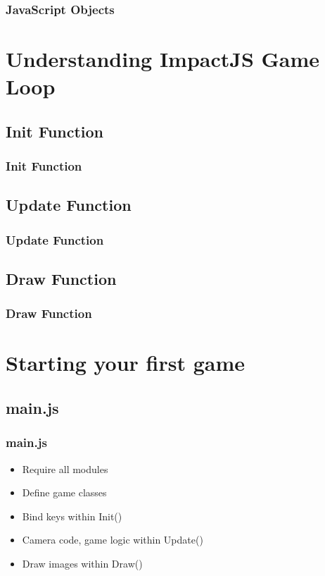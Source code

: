 \documentclass[red]{beamer}
\begin{document}
\begin{frame}
 	\frametitle{JavaScript Objects}
		\lstI
\end{frame}

\section{Understanding ImpactJS Game Loop}

\subsection{Init Function}

\begin{frame}
	\frametitle{Init Function}
		\lstll
\end{frame}

\subsection{Update Function}
\begin{frame}
	\frametitle{Update Function}
		\lstlll
\end{frame}

\subsection{Draw Function}
\begin{frame}
	\frametitle{Draw Function}
		\lstllll
\end{frame}

\section{Starting your first game}
\subsection{main.js}
\begin{frame}
    \frametitle{main.js}
    \begin{itemize}
        \item<1-> Require all modules
        \item<2-> Define game classes
        \item<3-> Bind keys within Init()
        \item<4-> Camera code, game logic within Update()
        \item<5-> Draw images within Draw()
    \end{itemize}
\end{frame}
\end{document}
